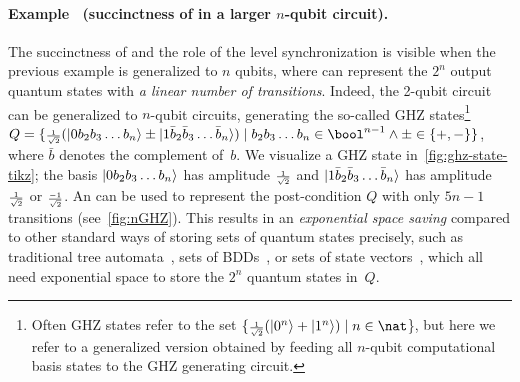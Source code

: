 \figGHZState
{}
\setcounter{cexGHZ}{\value{example}}
\paragraph{Example \theexample\ (succinctness of \lstas in a larger $n$-qubit circuit).}
The succinctness of \lstas and the role of the level synchronization is visible
when the previous example is generalized to $n$ qubits, where \lstas can represent the
$2^n$ output quantum states with \emph{a linear number of transitions}. 
Indeed, the 2-qubit circuit can be generalized to $n$-qubit circuits, generating the
so-called GHZ states\footnote{Often GHZ states refer to the set $\{\sfrac{1}{\sqrt{2}}(\ket{0^n}+\ket{1^{n}})\mid n\in \nat$\}, but here we refer to a generalized version obtained by feeding all $n$-qubit computational basis states to the GHZ generating circuit.}~\cite{GreenbergerHZ89}
$Q=\{\sfrac{1}{\sqrt{2}}(\ket{0b_2b_3\ldots b_n}\pm\ket{1\bar{b}_2\bar{b}_3\ldots
\bar{b}_{n}})\mid b_2b_3\ldots b_n\in \bool^{n-1} \land \pm \in \{+,-\}\}$,
where $\bar{b}$ denotes the complement of~$b$. We visualize a GHZ state in~\cref{fig:ghz-state-tikz}; the basis $\ket{0b_2b_3\ldots b_n}$ has amplitude $\sfrac{1}{\sqrt{2}}$ and $\ket{1\bar{b}_2\bar{b}_3\ldots
\bar{b}_{n}}$ has amplitude $\sfrac{1}{\sqrt{2}}$ or $\sfrac{-1}{\sqrt{2}}$.
An \lsta can be used to represent the post-condition $Q$ with only $5n-1$ transitions (see~\cref{fig:nGHZ}).
This results in an \emph{exponential space saving} compared to other standard
ways of storing sets of quantum states precisely, such as traditional tree automata~\cite{ChenCLLTY23},
sets of BDDs~\cite{TsaiJJ21}, or sets of state vectors~\cite{li2021svsim},
which all need exponential space to store the $2^n$ quantum states in~$Q$. 
%

